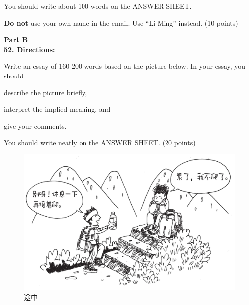 You should write about 100 words on the
ANSWER SHEET. 

\textbf{Do not} use your own name in the email. Use ``Li Ming''
instead. (10 points)


\vspace{2em}

\noindent
\textbf{Part B}\\
\textbf{52. Directions:} 

Write an essay of 160-200 words based on the
picture below. In your essay, you should
\begin{listwrite}
	\item 
 describe the picture briefly,
\item 
interpret the implied meaning, and 
\item 
give your comments. 
\end{listwrite}

You should write neatly on the ANSWER SHEET. (20 points)


\begin{figure}[h!]
	\centering
	\includegraphics[width=0.58\linewidth]{picture/2019.png}
	\caption*{途中}
\end{figure}




